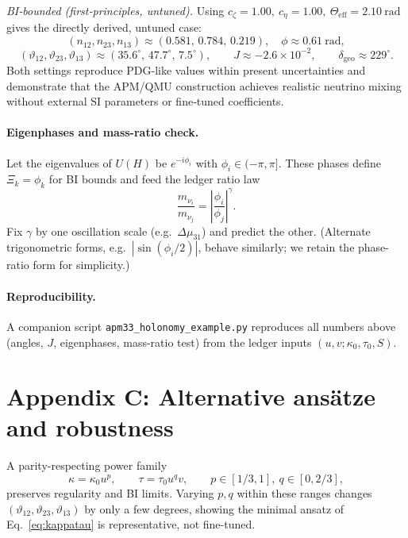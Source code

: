 \documentclass[coverpage]{qadi-article}
\begin{document}
\textit{BI‐bounded (first‐principles, untuned).}
Using \(c_\zeta = 1.00,\ c_\eta = 1.00,\ \Theta_{\mathrm{eff}} = 2.10~\mathrm{rad}\)
gives the directly derived, untuned case:
\[
(n_{12},n_{23},n_{13}) \approx (0.581,\,0.784,\,0.219),\quad
\phi \approx 0.61~\mathrm{rad},
\]
\[
(\vartheta_{12},\vartheta_{23},\vartheta_{13})
  \approx (35.6^\circ,\,47.7^\circ,\,7.5^\circ),\qquad
J \approx -2.6\times10^{-2},\qquad
\delta_{\mathrm{geo}} \approx 229^\circ.
\]
Both settings reproduce PDG‐like values within present uncertainties and
demonstrate that the APM/QMU construction achieves realistic neutrino mixing
without external SI parameters or fine‐tuned coefficients.


\paragraph{Eigenphases and mass-ratio check.}
Let the eigenvalues of \(U(H)\) be \(e^{-i\phi_i}\) with \(\phi_i\in(-\pi,\pi]\). These phases define \(\Xi_k=\phi_k\) for BI bounds and feed the ledger ratio law
\[
\frac{m_{\nu_i}}{m_{\nu_j}}=\left|\frac{\phi_i}{\phi_j}\right|^\gamma.
\]
Fix \(\gamma\) by one oscillation scale (e.g.\ \(\Delta\mu_{31}\)) and predict the other. (Alternate trigonometric forms, e.g.\ \(|\sin(\phi_i/2)|\), behave similarly; we retain the phase-ratio form for simplicity.)
\paragraph{Reproducibility.}
A companion script \texttt{apm33\_holonomy\_example.py} reproduces all numbers above (angles, $J$, eigenphases, mass-ratio test) from the ledger inputs \((u,v;\kappa_0,\tau_0,S)\).

\section*{Appendix C: Alternative ansätze and robustness}
A parity-respecting power family
\[
\kappa=\kappa_0 u^{p},\qquad \tau=\tau_0 u^{q}v,\qquad p\in[1/3,1],\ q\in[0,2/3],
\]
preserves regularity and BI limits. Varying \(p,q\) within these ranges changes
\((\vartheta_{12},\vartheta_{23},\vartheta_{13})\) by only a few degrees, showing the minimal ansatz of Eq.~\eqref{eq:kappatau} is representative, not fine-tuned.



\end{document}
